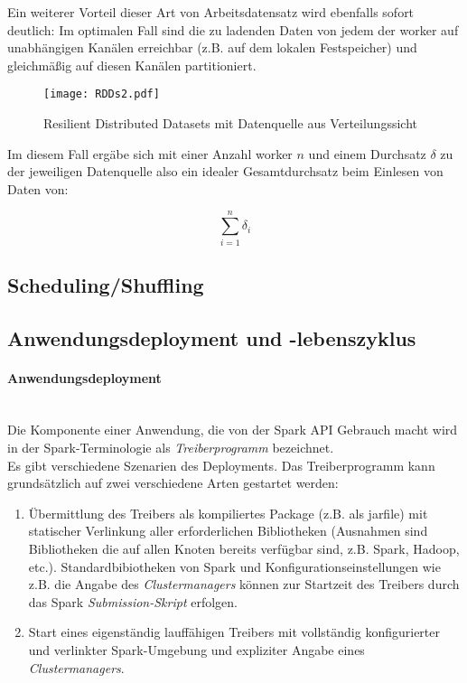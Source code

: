 Ein weiterer Vorteil dieser Art von Arbeitsdatensatz wird ebenfalls sofort deutlich: Im optimalen Fall sind die zu ladenden Daten von jedem der \gls{worker} auf unabhängigen Kanälen erreichbar (z.B. auf dem lokalen Festspeicher) und gleichmäßig auf diesen Kanälen partitioniert.

\begin{figure}[h!]
	\centering
  \texttt{[image: RDDs2.pdf]}
	\caption{Resilient Distributed Datasets mit Datenquelle aus Verteilungssicht}
	\label{fig:rdds2}
\end{figure}

Im diesem Fall ergäbe sich mit einer Anzahl \gls{worker} $n$ und einem Durchsatz $\delta$ zu der jeweiligen Datenquelle also ein idealer Gesamtdurchsatz beim Einlesen von Daten von:

\begin{equation}
	\sum_{i=1}^{n} \delta_i
\end{equation}

\subsection{Scheduling/Shuffling}

\subsection{Anwendungsdeployment und -lebenszyklus}

\paragraph{Anwendungsdeployment}\\

Die Komponente einer Anwendung, die von der Spark API Gebrauch macht wird in der Spark-Terminologie als \textit{Treiberprogramm} bezeichnet. \\

Es gibt verschiedene Szenarien des Deployments. Das Treiberprogramm kann grundsätzlich auf zwei verschiedene Arten gestartet werden:\\

\begin{enumerate}
	\item Übermittlung des Treibers als kompiliertes Package (z.B. als \gls{jarfile}) mit statischer Verlinkung aller erforderlichen Bibliotheken (Ausnahmen sind Bibliotheken die auf allen Knoten bereits verfügbar sind, z.B. Spark, Hadoop, etc.). Standardbibiotheken von Spark und Konfigurationseinstellungen wie z.B. die Angabe des \textit{Clustermanagers} können zur Startzeit des Treibers durch das Spark \textit{Submission-Skript} erfolgen.
	\item Start eines eigenständig lauffähigen Treibers mit vollständig konfigurierter und verlinkter Spark-Umgebung und expliziter Angabe eines \textit{Clustermanagers}.
\end{enumerate}

